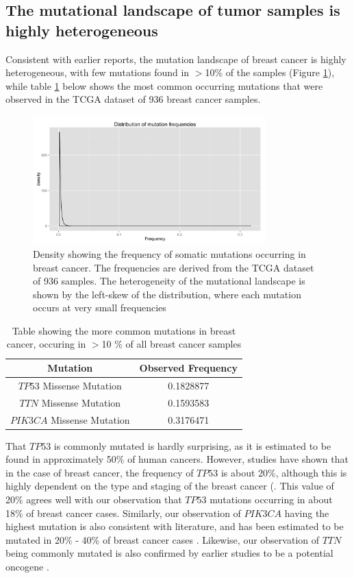 \documentclass[a4paper,12pt]{article}
\begin{document}
\subsection{The mutational landscape of tumor samples is highly
  heterogeneous}
Consistent with earlier reports, the mutation landscape of breast
cancer is highly heterogeneous, with few mutations found in $>$10\% of
the samples (Figure \ref{distribution}), while table \ref{mutations}
below shows the most common occurring mutations that were observed in
the TCGA dataset of 936 breast cancer samples.
\begin{figure}
\centering
\includegraphics[width=9cm]{distribution.png}
\caption[Density plot of somatic mutations in breast cancer]{Density
  showing the frequency of somatic mutations occurring in breast
  cancer. The frequencies are derived from the TCGA dataset of 936
  samples. The heterogeneity of the mutational landscape is shown by
  the left-skew of the distribution, where each mutation occurs at
  very small frequencies}
\label{distribution}
\end{figure}

\begin{table}
\caption{Table showing the more common mutations in breast cancer,
  occuring in $>$10 \% of all breast cancer samples}
\label{mutations}
\begin{tabular}{c c}
\hline
Mutation&Observed Frequency \\
\hline
$\textit{TP53}$ Missense Mutation & 0.1828877 \\
$\textit{TTN}$ Missense Mutation & 0.1593583 \\
$\textit{PIK3CA}$ Missense Mutation & 0.3176471 \\
\hline
\end{tabular}
\end{table}
That $\textit{TP53}$ is commonly mutated is hardly surprising, as it
is estimated to be found in approximately 50\% of human
cancers. However, studies have shown that in the case of breast
cancer, the frequency of $\textit{TP53}$ is about 20\%, although this
is highly dependent on the type and staging of the breast cancer
(\cite{Pharoah1999}. This value of 20\% agrees well with our
observation that $\textit{TP53}$ mutations occurring in about 18\% of
breast cancer cases. Similarly, our observation of $\textit{PIK3CA}$
having the highest mutation is also consistent with literature, and
has been estimated to be mutated in 20\% - 40\% of breast cancer cases
\cite{Cizkova2012}. Likewise, our observation of $\textit{TTN}$
being commonly mutated is also confirmed by earlier studies to be a
potential oncogene \cite{Greenman2009}.
\end{document}

